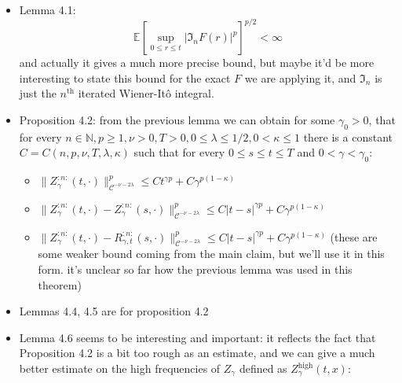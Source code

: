 \documentclass{report}
\theoremstyle{remark}
\theoremstyle{definition}
\begin{document}
\begin{itemize}
  \begin{itemize}
    \item Lemma 4.1: $$\mathbb{E}\left[\sup_{0\le r \le t} |\mathfrak{I}_n F(r)|^p\right]^{p/2} < \infty$$and actually it gives a much more precise bound, but maybe it'd be more interesting to state this bound for the exact $F$ we are applying it, and $\mathfrak{I}_n$ is just the $n^\text{th}$ iterated Wiener-Itô integral.
    \item Proposition 4.2: from the previous lemma we can obtain for some $\gamma_0 > 0$, that for every $n\in \mathbb{N}, p \ge 1, \nu > 0, T> 0, 0 \le \lambda \le 1/2, 0 < \kappa \le 1$ there is a constant $C = C(n, p, \nu, T, \lambda, \kappa)$ such that for every $0 \le s \le t \le T$ and $0 < \gamma < \gamma_0$:
    \begin{itemize}
      \item $\lVert Z^{:n:}_\gamma(t, \cdot) \rVert^p_{\mathcal{C}^{-\nu - 2\lambda}} \le C t^{\gamma p} + C \gamma^{p(1-\kappa)}$ 
      \item $\lVert Z^{:n:}_\gamma(t, \cdot) - Z^{:n:}_\gamma(s, \cdot) \rVert^p_{\mathcal{C}^{-\nu - 2\lambda}} \le C \lvert t- s\rvert^{\gamma p} + C \gamma^{p(1-\kappa)}$ 
      \item $\lVert Z^{:n:}_\gamma(t, \cdot) - R^{:n:}_{\gamma, t}(s, \cdot) \rVert^p_{\mathcal{C}^{-\nu - 2\lambda}} \le C \lvert t- s\rvert^{\gamma p} + C \gamma^{p(1-\kappa)}$ (these are some weaker bound coming from the main claim, but we'll use it in this form. it's unclear so far how the previous lemma was used in this theorem)
    \end{itemize}
    \item Lemmas 4.4, 4.5 are for proposition 4.2
    \item Lemma 4.6 seems to be interesting and important: it reflects the fact that Proposition 4.2 is a bit too rough as an estimate, and we can give a much better estimate on the high frequencies of $Z_\gamma$ defined as $Z_\gamma^{\text{high}}(t, x)$:
  \end{itemize}
\end{itemize}
\end{document}
